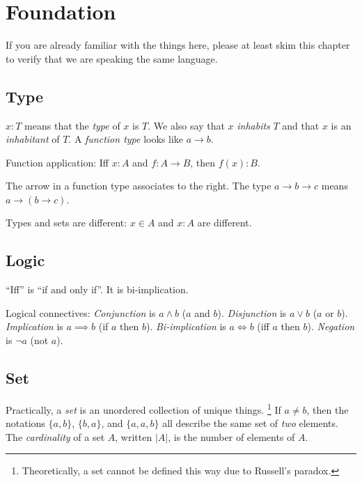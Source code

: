 \chapter{Foundation}

If you are already familiar with the things here,
please at least skim this chapter to verify that
we are speaking the same language.

\section{Type}

%
%
\(x : T\) means that the \emph{type} of \(x\) is \(T\).
We also say that \(x\) \emph{inhabits} \(T\) and that \(x\) is an \emph{inhabitant} of \(T\).
%
%
A \emph{function type} looks like \(a \to b\).

Function application:
Iff \(x:A\) and \(f:A\to B\), then \(f(x):B\).

The arrow in a function type associates to the right.
The type \(a \to b \to c\) means \(a \to (b \to c)\).

Types and sets are different:
\(x \in A\) and \(x : A\) are different.

\section{Logic}

%
%
``Iff'' is ``if and only if''.
It is bi-implication.

%
%
Logical connectives:
%
%
\emph{Conjunction} is \(a \wedge b\) (\(a\) and \(b\)).
%
%
\emph{Disjunction} is \(a \vee b\) (\(a\) or \(b\)).
%
\emph{Implication} is \(a \implies b\) (if \(a\) then \(b\)).
%
\emph{Bi-implication} is \(a \iff b\) (iff \(a\) then \(b\)).
%
%
\emph{Negation} is \(\neg a\) (not \(a\)).

\section{Set}

%
Practically, a \emph{set} is an unordered collection of unique things.%
%
\footnote{Theoretically, a set cannot be defined this way due to Russell's paradox.}
If \(a \neq b\), then the notations \(\{a,b\}\), \(\{b,a\}\), and \(\{a,a,b\}\)
all describe the same set of \emph{two} elements.
The \emph{cardinality} of a set \(A\), written \(|A|\),
is the number of elements of \(A\).

